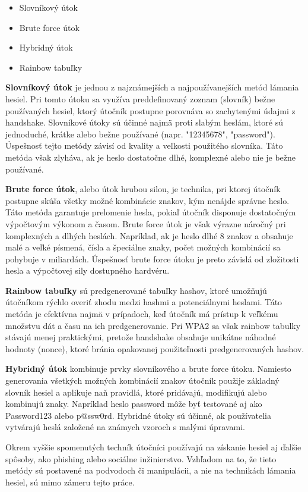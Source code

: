 \documentclass[12pt, twoside]{book}
\begin{document}
\begin{itemize}
\item Slovníkový útok
\item Brute force útok
\item Hybridný útok
\item Rainbow tabuľky
\end{itemize}

\textbf{Slovníkový útok} je jednou z najznámejších a najpoužívanejších metód lámania hesiel. Pri tomto útoku sa využíva preddefinovaný zoznam (slovník) bežne používaných hesiel, ktorý útočník postupne porovnáva so zachytenými údajmi z handshake. Slovníkové útoky sú účinné najmä proti slabým heslám, ktoré sú jednoduché, krátke alebo bežne používané (napr. "12345678", "password"). Úspešnosť tejto metódy závisí od kvality a veľkosti použitého slovníka. Táto metóda však zlyháva, ak je heslo dostatočne dlhé, komplexné alebo nie je bežne používané.

\textbf{Brute force útok}, alebo útok hrubou silou, je technika, pri ktorej útočník postupne skúša všetky možné kombinácie znakov, kým nenájde správne heslo. Táto metóda garantuje prelomenie hesla, pokiaľ útočník disponuje dostatočným výpočtovým výkonom a časom. Brute force útok je však výrazne náročný pri komplexných a dlhých heslách. Napríklad, ak je heslo dlhé 8 znakov a obsahuje malé a veľké písmená, čísla a špeciálne znaky, počet možných kombinácií sa pohybuje v miliardách. Úspešnosť brute force útoku je preto závislá od zložitosti hesla a výpočtovej sily dostupného hardvéru.

\textbf{Rainbow tabuľky} sú predgenerované tabuľky hashov, ktoré umožňujú útočníkom rýchlo overiť zhodu medzi hashmi a potenciálnymi heslami. Táto metóda je efektívna najmä v prípadoch, keď útočník má prístup k veľkému množstvu dát a času na ich predgenerovanie. Pri WPA2 sa však rainbow tabulky stávajú menej praktickými, pretože handshake obsahuje unikátne náhodné hodnoty (nonce), ktoré bránia opakovanej použiteľnosti predgenerovaných hashov. 


\textbf{Hybridný útok} kombinuje prvky slovníkového a brute force útoku. Namiesto generovania všetkých možných kombinácií znakov útočník použije základný slovník hesiel a aplikuje naň pravidlá, ktoré pridávajú, modifikujú alebo kombinujú znaky. Napríklad heslo password môže byť testované aj ako Password123 alebo p@ssw0rd. Hybridné útoky sú účinné, ak používatelia vytvárajú heslá založené na známych vzoroch s malými úpravami.

Okrem vyššie spomenutých techník útočníci používajú na získanie hesiel aj ďalšie spôsoby, ako phishing alebo sociálne inžinierstvo. Vzhľadom na to, že tieto metódy sú postavené na podvodoch či manipulácii, a nie na technikách lámania hesiel, sú mimo zámeru tejto práce.
\end{document}
